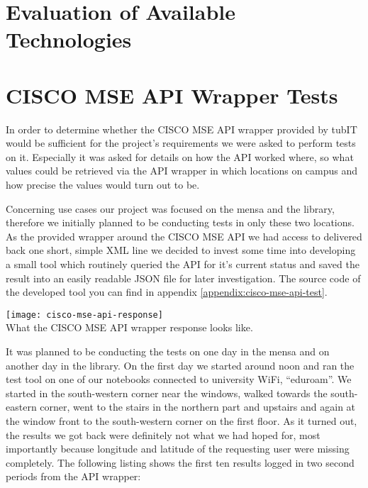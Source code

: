 \vspace{0.5cm}

\section{Evaluation of Available Technologies}


\vspace{0.5cm}

\section{CISCO MSE API Wrapper Tests}

In order to determine whether the CISCO MSE API wrapper provided by tubIT would be sufficient for the project's requirements we were asked to perform tests on it. Especially it was asked for details on how the API worked where, so what values could be retrieved via the API wrapper in which locations on campus and how precise the values would turn out to be.

Concerning use cases our project was focused on the mensa and the library, therefore we initially planned to be conducting tests in only these two locations. As the provided wrapper around the CISCO MSE API we had access to delivered back one short, simple XML line we decided to invest some time into developing a small tool which routinely queried the API for it's current status and saved the result into an easily readable JSON file for later investigation. The source code of the developed tool you can find in appendix \ref{appendix:cisco-mse-api-test}.

\begin{center}
    \texttt{[image: cisco-mse-api-response]}\\
    What the CISCO MSE API wrapper response looks like.
\end{center}

It was planned to be conducting the tests on one day in the mensa and on another day in the library. On the first day we started around noon and ran the test tool on one of our notebooks connected to university WiFi, \enquote{eduroam}. We started in the south-western corner near the windows, walked towards the south-eastern corner, went to the stairs in the northern part and upstairs and again at the window front to the south-western corner on the first floor. As it turned out, the results we got back were definitely not what we had hoped for, most importantly because longitude and latitude of the requesting user were missing completely. The following listing shows the first ten results logged in two second periods from the API wrapper:

